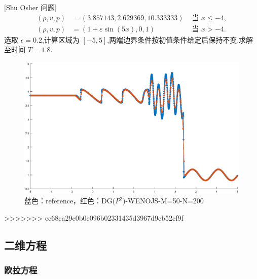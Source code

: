 \documentclass{book}
\begin{document}
\begin{example}
\begin{example}{}{}
\begin{example}
\begin{example}
\begin{example}
\begin{example}
\begin{example}{}{}
\begin{example}{}{}
    [Shu Osher 问题\cite{RN109}]
    \begin{equation}
        \begin{aligned}
            (\rho, v, p) & =(3.857143,2.629369,10.333333)   & \text { 当 } x \leq-4, \\
            (\rho, v, p) & =(1+\varepsilon \sin (5 x), 0,1) & \text { 当 } x>-4 .
        \end{aligned}
    \end{equation}
    选取 $\epsilon = 0.2$,计算区域为 $[-5,5]$,两端边界条件按初值条件给定后保持不变,求解至时间 $T=1.8$.
    \begin{figure}[H]
        \centering
        \label{fig:}
        \includegraphics[width=0.7\linewidth]{fig/shu_osher.eps}
        \caption{蓝色：reference，红色：DG($P^2$)-WENOJS-M=50-N=200}
    \end{figure}
    >>>>>>> ec68ca29c0b0e096b02331435d3967d9cb52cf9f

\end{example}

\subsection{二维方程}
\subsubsection{欧拉方程}

\end{example}
\end{example}
\end{example}
\end{example}
\end{example}
\end{example}
\end{example}
\end{document}
